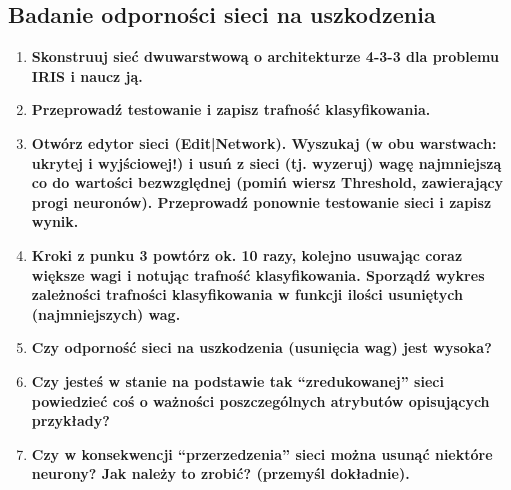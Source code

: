 \subsection{Badanie odporności sieci na uszkodzenia}
\begin{enumerate}
\item \textbf{Skonstruuj sieć dwuwarstwową o architekturze 4-3-3 dla problemu IRIS i naucz ją.}

\item \textbf{
Przeprowadź testowanie i zapisz trafność klasyfikowania.}

\item \textbf{
Otwórz edytor sieci (Edit|Network). Wyszukaj (w obu warstwach: ukrytej i wyjściowej!) i usuń z sieci (tj. wyzeruj) wagę najmniejszą co do wartości bezwzględnej (pomiń wiersz Threshold, zawierający progi neuronów). Przeprowadź ponownie testowanie sieci i zapisz wynik.}

\item \textbf{
Kroki z punku 3 powtórz ok. 10 razy, kolejno usuwając coraz większe wagi i notując trafność klasyfikowania. Sporządź wykres zależności trafności klasyfikowania w funkcji ilości usuniętych (najmniejszych) wag.}

\item \textbf{
Czy odporność sieci na uszkodzenia (usunięcia wag) jest wysoka?}

\item \textbf{
Czy jesteś w stanie na podstawie tak “zredukowanej” sieci powiedzieć coś o ważności poszczególnych atrybutów opisujących przykłady?}

\item \textbf{
Czy w konsekwencji “przerzedzenia” sieci można usunąć niektóre neurony? Jak należy to zrobić? (przemyśl dokładnie).}
\end{enumerate}

